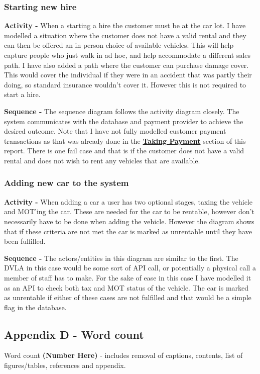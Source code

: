     \subsubsection{Starting new hire}
      \textbf{Activity -} When a starting a hire the customer must be at the car lot. I have modelled a situation where the customer does not have
      a valid rental and they can then be offered an in person choice of available vehicles. This will help capture people who just walk in ad hoc,
      and help accommodate a different sales path. I have also added a path where the customer can purchase damage cover. This would cover the
      individual if they were in an accident that was partly their doing, so standard insurance wouldn't cover it. However this is not required to 
      start a hire.

      \noindent\textbf{Sequence -} The sequence diagram follows the activity diagram closely. The system communicates with the database and payment
      provider to achieve the desired outcome. Note that I have not fully modelled customer payment transactions as that was already done in the
      \hyperref[sec:design:payment]{\textbf{Taking Payment}} section of this report. There is one fail case and that is if the customer does not have
      a valid rental and does not wish to rent any vehicles that are available.

    \subsubsection{Adding new car to the system}
      \textbf{Activity -} When adding a car a user has two optional stages, taxing the vehicle and MOT'ing the car. These are needed for the 
      car to be rentable, however don't necessarily have to be done when adding the vehicle. However the diagram shows that if these criteria are not 
      met the car is marked as unrentable until they have been fulfilled.

      \noindent\textbf{Sequence -} The actors/entities in this diagram are similar to the first. The DVLA in this case would be some sort of API call, 
      or potentially a physical call a member of staff has to make. For the sake of ease in this case I have modelled it as an API to check both tax and 
      MOT status of the vehicle. The car is marked as unrentable if either of these cases are not fulfilled and that would be a simple flag in the database.
  
  \newpage

  \subsection{Appendix D - Word count}
    \label{sec:AppendixD}
    Word count \textbf{(Number Here)} - includes removal of captions, contents, list of figures/tables, references and appendix.